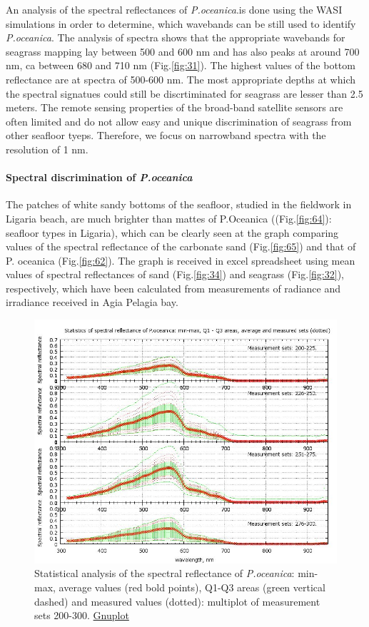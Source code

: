 \documentclass[10pt, a4paper]{article}
\begin{document}
An analysis of the spectral reflectances of \textit{P.oceanica}.is done using the WASI simulations in order to
determine, which wavebands can be still used to identify \textit{P.oceanica}. The analysis of spectra shows
that the appropriate wavebands for seagrass mapping lay between 500 and 600 nm and has
also peaks at around 700 nm, ca between 680 and 710 nm (Fig.\ref{fig:31}). The highest values of the bottom
reflectance are at spectra of 500-600 nm. The most appropriate depths at which the spectral signatues
could still be discrtiminated for seagrass are lesser than 2.5 meters.
The remote sensing properties of the broad-band satellite sensors are often limited and do not allow
easy and unique discrimination of seagrass from other seafloor tyeps. Therefore, we focus on narrowband
spectra with the resolution of 1 nm.

\paragraph{Spectral discrimination of \textit{P.oceanica}}
The patches of white sandy bottoms of the seafloor, studied in the fieldwork in Ligaria beach, are
much brighter than mattes of P.Oceanica ((Fig.\ref{fig:64}): seafloor types in Ligaria), which can be clearly seen
at the graph comparing values of the spectral reflectance of the carbonate sand (Fig.\ref{fig:65}) and that of P.
oceanica (Fig.\ref{fig:62}).
The graph is received in excel spreadsheet using mean values of spectral reflectances of
sand (Fig.\ref{fig:34}) and seagrass (Fig.\ref{fig:32}), respectively, which have been calculated from measurements of radiance and
irradiance received in Agia Pelagia bay.

\begin{figure}[h]
	\centering
	\includegraphics[scale=0.40]{GNU-19.jpg}
	\caption{Statistical analysis of the spectral reflectance of \textit{P.oceanica}: min-max, average values (red bold points), Q1-Q3 areas (green vertical dashed) and 			measured values (dotted): multiplot of measurement sets 200-300. \href{http://www.gnuplot.info/}{Gnuplot}}
	\label{fig:33}
\end{figure}
\end{document}

